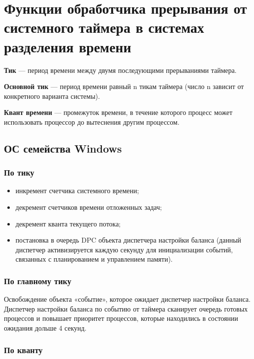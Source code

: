 \setcounter{page}{2}
\chapter{Функции обработчика прерывания от системного таймера в системах разделения времени}


\textbf{Тик} --- период времени между двумя последующими прерываниями таймера.

\textbf{Основной тик} --- период времени равный n тикам таймера (число n зависит от конкретного варианта системы).

\textbf{Квант времени} --- промежуток времени, в течение которого процесс может использовать процессор до вытеснения другим процессом.

\section{ОС семейства Windows}

\subsection*{По тику}
\begin{itemize}[label=---]
	\item инкремент счетчика системного времени;
	\item декремент счетчиков времени отложенных задач;
	\item декремент кванта текущего потока; %
	\item постановка в очередь DPC объекта диспетчера настройки баланса (данный диспетчер активизируется каждую секунду для инициализации событий, связанных с планированием и управлением памяти).
\end{itemize}

\subsection*{По главному тику}
Освобождение объекта «событие», которое ожидает диспетчер настройки баланса. Диспетчер настройки баланса по событию от таймера сканирует очередь готовых процессов и повышает приоритет процессов, которые находились в состоянии ожидания дольше 4 секунд.


\subsection*{По кванту}

